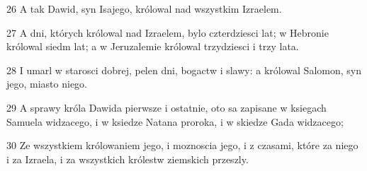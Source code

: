 \par 26 A tak Dawid, syn Isajego, królowal nad wszystkim Izraelem.
\par 27 A dni, których królowal nad Izraelem, bylo czterdziesci lat; w Hebronie królowal siedm lat; a w Jeruzalemie królowal trzydziesci i trzy lata.
\par 28 I umarl w starosci dobrej, pelen dni, bogactw i slawy: a królowal Salomon, syn jego, miasto niego.
\par 29 A sprawy króla Dawida pierwsze i ostatnie, oto sa zapisane w ksiegach Samuela widzacego, i w ksiedze Natana proroka, i w skiedze Gada widzacego;
\par 30 Ze wszystkiem królowaniem jego, i moznoscia jego, i z czasami, które za niego i za Izraela, i za wszystkich królestw ziemskich przeszly.


